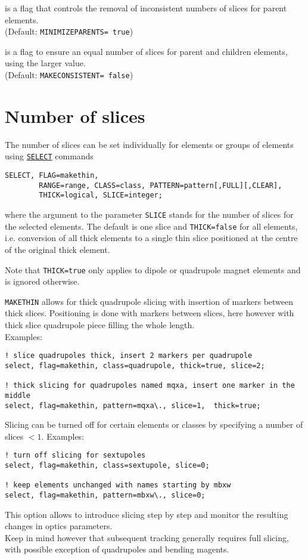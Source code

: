\begin{madlist}
    is a flag that controls the removal of
   inconsistent numbers of slices for parent elements. \\
   (Default: {\tt MINIMIZEPARENTS= true})

    is a flag to ensure an equal number of slices
   for parent and children elements, using the larger value. \\
   (Default: {\tt MAKECONSISTENT= false})

\end{madlist}

\section{Number of slices}

The number of slices can be set individually for elements or groups of
elements using
\href{http://mad.web.cern.ch/mad/madx.old/Introduction/select.html}{\tt SELECT} 
commands
\begin{verbatim}
SELECT, FLAG=makethin, 
        RANGE=range, CLASS=class, PATTERN=pattern[,FULL][,CLEAR],
        THICK=logical, SLICE=integer;
\end{verbatim}
where the argument to the parameter {\tt SLICE} stands for the number of
slices for the selected elements. The default is one slice and
{\tt THICK=false} for all elements, i.e. conversion of all thick
elements to a single thin slice positioned at the centre of the original
thick element.

Note that {\tt THICK=true} only applies to dipole or quadrupole magnet
elements and is ignored otherwise.  

{\tt MAKETHIN} allows for thick quadrupole slicing with insertion of
markers between thick slices. Positioning is done with markers between
slices, here however with thick slice quadrupole piece filling the whole
length.  \\  
Examples:
\begin{verbatim}
! slice quadrupoles thick, insert 2 markers per quadrupole
select, flag=makethin, class=quadrupole, thick=true, slice=2; 

! thick slicing for quadrupoles named mqxa, insert one marker in the middle
select, flag=makethin, pattern=mqxa\., slice=1,  thick=true; 
\end{verbatim}


Slicing can be turned off for certain elements or classes by specifying
a number of slices $< 1$. Examples: 
\begin{verbatim}
! turn off slicing for sextupoles
select, flag=makethin, class=sextupole, slice=0; 

! keep elements unchanged with names starting by mbxw
select, flag=makethin, pattern=mbxw\., slice=0; 
\end{verbatim}
This option allows to introduce slicing step by step and monitor the
resulting changes in optics parameters.\\
Keep in mind however that subsequent tracking generally requires full slicing, with
possible exception of quadrupoles and bending magents. 


